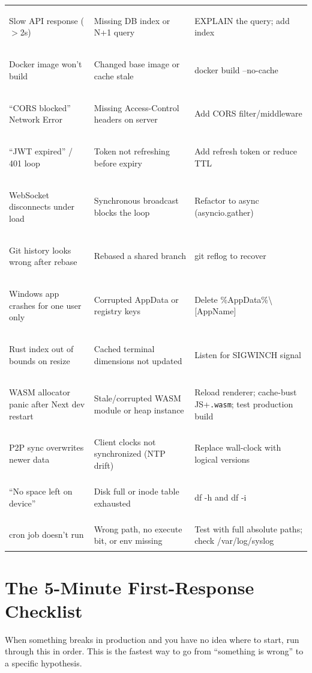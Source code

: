 \documentclass[11pt, letterpaper]{article}
\begin{document}
{\begin{tabularx}{\textwidth}{>{\bfseries\raggedright\arraybackslash}p{4.2cm}
                              >{\raggedright\arraybackslash}X
                              >{\ttfamily\raggedright\arraybackslash}p{4.5cm}}
\rowcolor{rowRe} Slow API response ($>$2s) & Missing DB index or N+1 query & EXPLAIN the query; add index \\
\rowcolor{rowA}  Docker image won't build & Changed base image or cache stale & docker build --no-cache \\
\rowcolor{rowRe} ``CORS blocked'' Network Error & Missing Access-Control headers on server & Add CORS filter/middleware \\
\rowcolor{rowA}  ``JWT expired'' / 401 loop & Token not refreshing before expiry & Add refresh token or reduce TTL \\
\rowcolor{rowRe} WebSocket disconnects under load & Synchronous broadcast blocks the loop & Refactor to async (asyncio.gather) \\
\rowcolor{rowA}  Git history looks wrong after rebase & Rebased a shared branch & git reflog to recover \\
\rowcolor{rowRe} Windows app crashes for one user only & Corrupted AppData or registry keys & Delete \%AppData\%\textbackslash[AppName] \\
\rowcolor{rowA}  Rust index out of bounds on resize & Cached terminal dimensions not updated & Listen for SIGWINCH signal \\
\rowcolor{rowRe} WASM allocator panic after Next dev restart & Stale/corrupted WASM module or heap instance & Reload renderer; cache-bust JS+\texttt{.wasm}; test production build \\
\rowcolor{rowRe} P2P sync overwrites newer data & Client clocks not synchronized (NTP drift) & Replace wall-clock with logical versions \\
\rowcolor{rowA}  ``No space left on device'' & Disk full or inode table exhausted & df -h and df -i \\
\rowcolor{rowRe} cron job doesn't run & Wrong path, no execute bit, or env missing & Test with full absolute paths; check /var/log/syslog \\
\bottomrule
\end{tabularx}}

\vspace{8pt}
\section*{The 5-Minute First-Response Checklist}

When something breaks in production and you have no idea where to start, run through this in order. This is the fastest way to go from ``something is wrong'' to a specific hypothesis.
\end{document}
